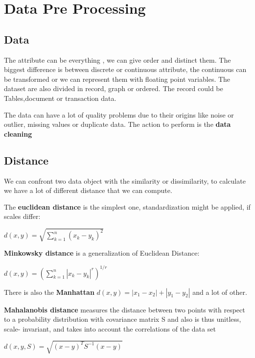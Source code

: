 \chapter{Data Pre Processing}
\section{Data}
The attribute can be everything , we can give order and distinct them. The biggest difference is between discrete or continuous attribute, the continuous can be transformed or we can represent them with floating point variables.
The dataset are also divided in record, graph or ordered. The record could be Tables,document or transaction data.

The data can have a lot of quality problems due to their origins like noise or outlier, missing values or duplicate data. The action to perform is the \textbf{data cleaning}

\section{Distance}
We can confront two data object with the similarity or dissimilarity, to calculate we have a lot of different distance that we can compute.

The \textbf{euclidean distance }is the simplest one, standardization might be applied, if scales differ:
\begin{center}
    $d(x,y) = \sqrt{\sum\limits_{k=1}^n (x_k - y_k)^2 }$
\end{center}

\textbf{Minkowsky distance} is a generalization of Euclidean Distance:

\begin{center}
    $d(x,y) = (\sum\limits_{k=1}^n | x_k - y_k |^r )^{1/r} $
\end{center}
There is also the \textbf{Manhattan} $d(x,y) = |x_1 - x_2| + |y_1 -y_2| $ and a lot of other.

\textbf{Mahalanobis distance} measures the distance between two points with respect to a probability distribution with covariance matrix S and also  is thus unitless, scale- invariant, and takes into account the correlations of the data set
\begin{center}
    $ d(x,y,S) = \sqrt{(x-y)^T S^{-1} (x-y)}$
\end{center}
